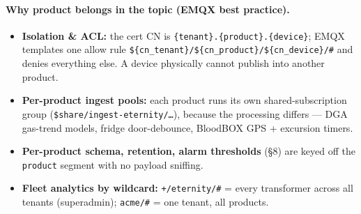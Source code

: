 \documentclass[11pt,a4paper]{article}
\begin{document}
\paragraph{Why product belongs in the topic (EMQX best practice).}
\begin{itemize}[leftmargin=1.4em,itemsep=1pt]
  \item \textbf{Isolation \& ACL:} the cert CN is \texttt{\{tenant\}.\{product\}.\{device\}};
        EMQX templates one allow rule \texttt{\$\{cn\_tenant\}/\$\{cn\_product\}/\$\{cn\_device\}/\#}
        and denies everything else. A device physically cannot publish into another product.
  \item \textbf{Per-product ingest pools:} each product runs its own shared-subscription group
        (\texttt{\$share/\allowbreak ingest-eternity/\dots}), because the processing differs — DGA gas-trend
        models, fridge door-debounce, BloodBOX GPS + excursion timers.
  \item \textbf{Per-product schema, retention, alarm thresholds} (\S8) are keyed off the
        \texttt{product} segment with no payload sniffing.
  \item \textbf{Fleet analytics by wildcard:} \texttt{+/eternity/\#} = every transformer across
        all tenants (superadmin); \texttt{acme/\#} = one tenant, all products.
\end{itemize}
\end{document}
